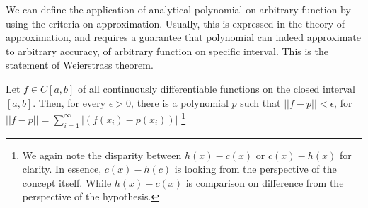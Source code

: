 We can define the application of analytical polynomial on arbitrary function by using the criteria on approximation. Usually, this is expressed in the theory of approximation, and requires a guarantee that polynomial can indeed approximate to arbitrary accuracy, of arbitrary function on specific interval. This is the statement of Weierstrass theorem. 

\begin{theorem}\label{thm:Weierstrass_AT}
    Let $f\in C[a,b]$ of all continuously differentiable functions on the closed interval $[a,b]$. Then, for every $\epsilon > 0$, there is a polynomial $p$ such that $||f-p||< \epsilon$, for $||f-p||=\sum_{i=1}^{\infty}|(f(x_{i})-p(x_{i}))|$ \footnote{We again note the disparity between $h(x)-c(x)$ or $c(x)-h(x)$ for clarity. In essence, $c(x)-h(c)$ is looking from the perspective of the concept itself. While $h(x)-c(x)$ is comparison on difference from the perspective of the hypothesis.}
\end{theorem}


